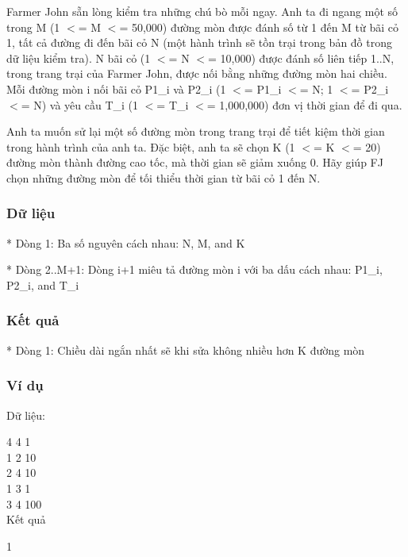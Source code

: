 



   Farmer John sẵn lòng kiểm tra những chú bò mỗi ngay. Anh ta đi ngang một số  trong M (1 $<$= M $<$= 50,000) đường mòn được đánh số từ 1 đến M từ bãi cỏ 1, tất  cả đường đi đến bãi cỏ N (một hành trình sẽ tồn trại trong bản đồ trong dữ  liệu kiểm tra). N bãi cỏ (1 $<$= N $<$= 10,000) được đánh số liên tiếp 1..N, trong  trang trại của Farmer John, được nối bằng những đường mòn hai chiều. Mỗi đường  mòn i nối bãi cỏ P1\_i và P2\_i (1 $<$= P1\_i $<$= N; 1 $<$= P2\_i $<$= N) và yêu cầu T\_i  (1 $<$= T\_i $<$= 1,000,000) đơn vị thời gian để đi qua.  

   Anh ta muốn sử lại một số đường mòn trong trang trại để tiết kiệm thời gian trong  hành trình của anh ta. Đặc biệt, anh ta sẽ chọn K (1 $<$= K $<$= 20) đường mòn thành  đường cao tốc, mà thời gian sẽ giảm xuống 0. Hãy giúp FJ chọn những đường mòn để  tối thiểu thời gian từ bãi cỏ 1 đến N.  

\subsubsection{   Dữ liệu  }

   * Dòng 1: Ba số nguyên cách nhau: N, M, and K  

   * Dòng 2..M+1: Dòng i+1 miêu tả đường mòn i với ba dấu cách nhau: P1\_i, P2\_i, and T\_i  

\subsubsection{   Kết quả  }

   * Dòng 1: Chiều dài ngắn nhất sẽ khi sửa không nhiều hơn K đường mòn  

\subsubsection{   Ví dụ  }

   Dữ liệu:  

   4 4 1   
\\   1 2 10   
\\   2 4 10   
\\   1 3 1   
\\   3 4 100   
\\

   Kết quả  

   1  